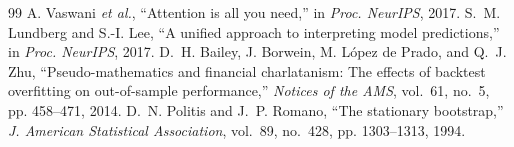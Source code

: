 \documentclass[conference]{IEEEtran}
\begin{document}
\begin{thebibliography}{99}
 A. Vaswani \emph{et al.}, ``Attention is all you need,'' in \emph{Proc. NeurIPS}, 2017.
 S.~M. Lundberg and S.-I. Lee, ``A unified approach to interpreting model predictions,'' in \emph{Proc. NeurIPS}, 2017.
 D.~H. Bailey, J. Borwein, M. L\'opez de Prado, and Q.~J. Zhu, ``Pseudo-mathematics and financial charlatanism: The effects of backtest overfitting on out-of-sample performance,'' \emph{Notices of the AMS}, vol.~61, no.~5, pp. 458--471, 2014.
 D.~N. Politis and J.~P. Romano, ``The stationary bootstrap,'' \emph{J. American Statistical Association}, vol.~89, no.~428, pp. 1303--1313, 1994.
\end{thebibliography}
\end{document}
